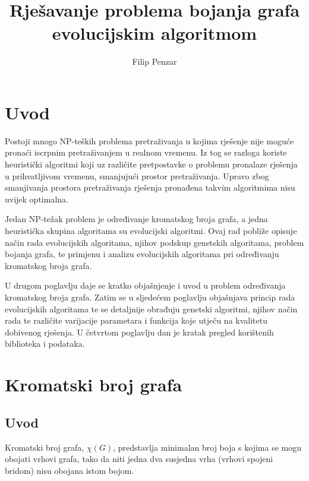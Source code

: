 \documentclass[times, utf8, zavrsni]{fer}
\begin{document}

\title{Rješavanje problema bojanja grafa evolucijskim algoritmom}

\author{Filip Penzar}

\maketitle


\zahvala{}

\tableofcontents

\chapter{Uvod}
Postoji mnogo NP-teških problema pretraživanja u kojima rješenje nije moguće pronaći iscrpnim pretraživanjem u realnom vremenu. Iz tog se razloga koriste heuristički algoritmi koji uz različite pretpostavke o problemu pronalaze rješenja u prihvatljivom vremenu, smanjujući prostor pretraživanja. Upravo zbog smanjivanja prostora pretraživanja rješenja pronađena takvim algoritmima nisu uvijek optimalna.

Jedan NP-težak problem je određivanje kromatskog broja grafa, a jedna heuristička skupina algoritama su evolucijski algoritmi. Ovaj rad pobliže opisuje način rada evolucijskih algoritama, njihov podskup genetskih algoritama, problem bojanja grafa, te primjenu i analizu evolucijskih algoritama pri određivanju kromatskog broja grafa.

U drugom poglavlju daje se kratko objašnjenje i uvod u problem određivanja kromatskog broja grafa. Zatim se u sljedećem poglavlju objašnjava princip rada evolucijskih algoritama te se detaljnije obrađuju genetski algoritmi, njihov način rada te različite varijacije parametara i funkcija koje utječu na kvalitetu dobivenog rješenja. U četvrtom poglavlju dan je kratak pregled korištenih biblioteka i podataka.

\chapter{Kromatski broj grafa}
\section{Uvod}
Kromatski broj grafa, $\chi(G)$, predstavlja minimalan broj boja s kojima se mogu obojati vrhovi grafa, tako da niti jedna dva susjedna vrha (vrhovi spojeni bridom) nisu obojana istom bojom. 
\end{document}
